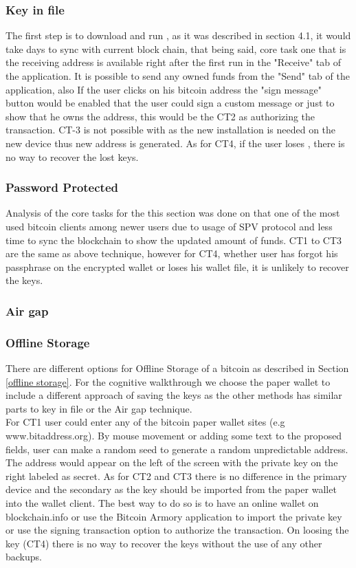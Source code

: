
\subsubsection{Key in file}
The first step is to download and run \bitcoinclient, as it was described in section 4.1, it would take days to sync with current block chain, that being said, core task one that is the receiving address is available right after the first run in the "Receive" tab of the application. It is possible to send any owned funds from the "Send" tab of the application, also If the user clicks on his bitcoin address the "sign message" button would be enabled that the user could sign a custom message or just to show that he owns the address, this would be the CT2 as authorizing the transaction. CT-3 is not possible with \bitcoinclient as the new installation is needed on the new device thus new address is generated. As for CT4, if the user loses \walletfile, there is no way to recover the lost keys.


\subsubsection{Password Protected}
Analysis of the core tasks for the this section was done on \multibit that one of the most used bitcoin clients among newer users due to usage of SPV protocol and less time to sync the blockchain to show the updated amount of funds. CT1 to CT3 are the same as above technique, however for CT4, whether user has forgot his passphrase on the encrypted wallet or loses his wallet file, it is unlikely to recover the keys.


\subsubsection{Air gap}


\subsubsection{Offline Storage}
There are different options for Offline Storage of a bitcoin as described in Section \ref{offline storage}. For the cognitive walkthrough we choose the paper wallet to include a different approach of saving the keys as the other methods has similar parts to key in file or the Air gap technique.\\
For CT1 user could enter any of the bitcoin paper wallet sites (e.g www.bitaddress.org). By mouse movement or adding some text to the proposed fields, user can make a random seed to generate a random unpredictable address. The address would appear on the left of the screen with the private key on the right labeled as secret. As for CT2 and CT3 there is no difference in the primary device and the secondary as the key should be imported from the paper wallet into the wallet client. The best way to do so is to have an online wallet on blockchain.info or use the Bitcoin Armory application to import the private key or use the signing transaction option to authorize the transaction. On loosing the key (CT4) there is no way to recover the keys without the use of any other backups.


